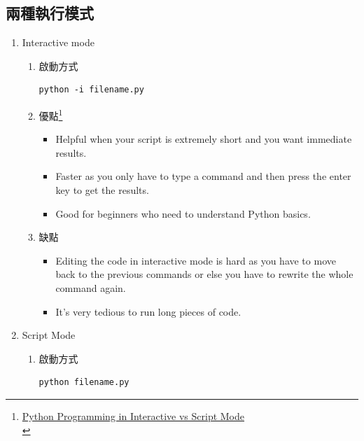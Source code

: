 \documentclass[a4paper,12pt]{article}
\begin{document}
\subsection{兩種執行模式}
\label{sec:orgd67482a}
\begin{enumerate}
\item Interactive mode
\label{sec:org4a4a15f}
\begin{enumerate}
\item 啟動方式
\label{sec:orgef298c3}
\lstset{breaklines=true,language=shell,label= ,caption= ,captionpos=b,numbers=none}
\begin{lstlisting}
python -i filename.py
\end{lstlisting}
\item 優點\footnote{\href{https://stackabuse.com/python-programming-in-interactive-vs-script-mode/}{Python Programming in Interactive vs Script Mode}\\}
\label{sec:orgbd2b595}
\begin{itemize}
\item Helpful when your script is extremely short and you want immediate results.\\
\item Faster as you only have to type a command and then press the enter key to get the results.\\
\item Good for beginners who need to understand Python basics.\\
\end{itemize}
\item 缺點
\label{sec:org765b102}
\begin{itemize}
\item Editing the code in interactive mode is hard as you have to move back to the previous commands or else you have to rewrite the whole command again.\\
\item It's very tedious to run long pieces of code.\\
\end{itemize}
\end{enumerate}
\item Script Mode
\label{sec:orgc734433}
\begin{enumerate}
\item 啟動方式
\label{sec:orgd2b4aab}
\lstset{breaklines=true,language=bash,label= ,caption= ,captionpos=b,numbers=none}
\begin{lstlisting}
python filename.py
\end{lstlisting}

\end{enumerate}
\end{enumerate}
\end{document}
